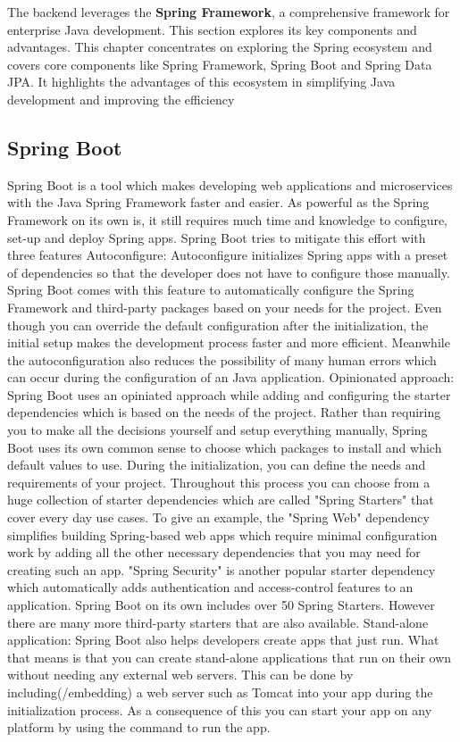 \Author{\daAuthorThree}

    The backend leverages the \textbf{Spring Framework}, a comprehensive framework for enterprise Java development. This section explores its key components and advantages.
    This chapter concentrates on exploring the Spring ecosystem and covers core components like Spring Framework, Spring Boot and Spring Data JPA. It highlights the advantages of this ecosystem in simplifying Java development and improving the efficiency

    \subsection{Spring Boot}
    Spring Boot is a tool which makes developing web applications and microservices with the Java Spring Framework faster and easier. As powerful as the Spring Framework on its own is, it still requires much time and knowledge to configure, set-up and deploy Spring apps. Spring Boot tries to mitigate this effort with three features
    Autoconfigure:
    Autoconfigure initializes Spring apps with a preset of dependencies so that the developer does not have to configure those manually. Spring Boot comes with this feature to automatically configure the Spring Framework and third-party packages based on your needs for the project. Even though you can override the default configuration
    after the initialization, the initial setup makes the development process faster and more efficient. Meanwhile the autoconfiguration also reduces the possibility of many human errors which can occur during the configuration of an Java application.
    Opinionated approach:
    Spring Boot uses an opiniated approach while adding and configuring the starter dependencies which is based on the needs of the project. Rather than requiring you to make all the decisions yourself and setup everything manually, Spring Boot uses its own common sense to choose which packages to install and which default values to use.
    During the initialization, you can define the needs and requirements of your project. Throughout this process you can choose from a huge collection of starter dependencies which are called "Spring Starters" that cover every day use cases.
    To give an example, the "Spring Web" dependency simplifies building Spring-based web apps which require minimal configuration work by adding all the other necessary dependencies that you may need for creating such an app. "Spring Security" is another popular starter dependency which automatically adds authentication and access-control
    features to an application.
    Spring Boot on its own includes over 50 Spring Starters. However there are many more third-party starters that are also available.
    Stand-alone application:
    Spring Boot also helps developers create apps that just run. What that means is that you can create stand-alone applications that run on their own without needing any external web servers.
    This can be done by including(/embedding) a web server such as Tomcat into your app during the initialization process. As a consequence of this you can start your app on any platform by using the command to run the app.
    

